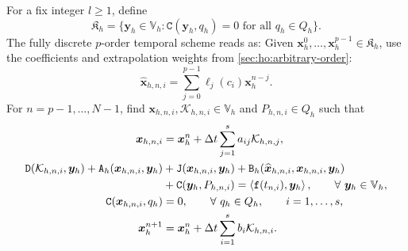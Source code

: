 \documentclass[11pt,a4paper]{article}
\newif\ifcurrentchanges
\newenvironment{currentchange}{\begingroup\ifcurrentchanges\color{red}\fi}{\endgroup}
\newcommand{\bs}{\boldsymbol}
\newcommand{\dt}{\Delta t}
\DeclareMathOperator{\curl}{curl}
\newcommand{\V}{\mathbb V}
\newcommand{\DD}{\mathtt D}
\newcommand{\Aform}{\mathtt A}
\newcommand{\JJ}{\mathtt J}
\newcommand{\BB}{\mathtt B}
\newcommand{\CC}{\mathtt C}
\newcommand{\ff}{\mathtt f}
\newcommand{\dual}[2]{\left\langle#1,#2\right\rangle}
\theoremstyle{definition}
\numberwithin{equation}{section}
\begin{document}


For a fix integer $l\ge 1$, define 
\begin{equation}\label{eq:ho:FE-kernel}
 \mathfrak K_h=\{\bs y_h\in\V_h:\CC(\bs y_h,q_h)=0
                             \text{ for all }q_h\in Q_h\}.
\end{equation}
The fully discrete $p$-order temporal scheme reads as: Given $\bs x_h^0,\ldots,\bs x_h^{p-1}\in\mathfrak K_h$, use the coefficients
and extrapolation weights from \cref{sec:ho:arbitrary-order}:
\begin{equation}\label{eq:ho:FE-predictor}
 \widehat{\bs x}_{h,n,i}=\sum_{j=0}^{p-1}\ell_j(c_i)\bs x_h^{n-j}.
\end{equation}
For $n=p-1,\ldots,N-1$, find
$\bs x_{h,n,i},\mathcal K_{h,n,i}\in\V_h$ and $P_{h,n,i}\in Q_h$ such that
\begin{subequations}\label{eq:ho:FE-scheme}
\begin{align}
 \bs x_{h,n,i}&=\bs x_h^n+\dt\sum_{j=1}^s a_{ij}\mathcal K_{h,n,j},\\
 \label{eq:ho:FE-scheme-b}
 \DD(\mathcal K_{h,n,i},\bs y_h)+\Aform_h(\bs x_{h,n,i},\bs y_h)
 &+\JJ(\bs x_{h,n,i},\bs y_h)
   +\BB_h(\widehat{\bs x}_{h,n,i},\bs x_{h,n,i},\bs y_h)
  \notag\\
 &
 +\CC(\bs y_h,P_{h,n,i})=\dual{\ff(t_{n,i})}{\bs y_h},\qquad\forall~\bs y_h\in \V_h,\\
\label{eq:ho:FE-scheme-c} \CC(\bs x_{h,n,i},q_h)&=0,\qquad\forall~q_h\in Q_h,\qquad i=1,\ldots,s,\\
 \bs x_h^{n+1}&=\bs x_h^n+\dt\sum_{i=1}^s b_i\mathcal K_{h,n,i}.
\end{align}
\end{subequations}
\end{document}

